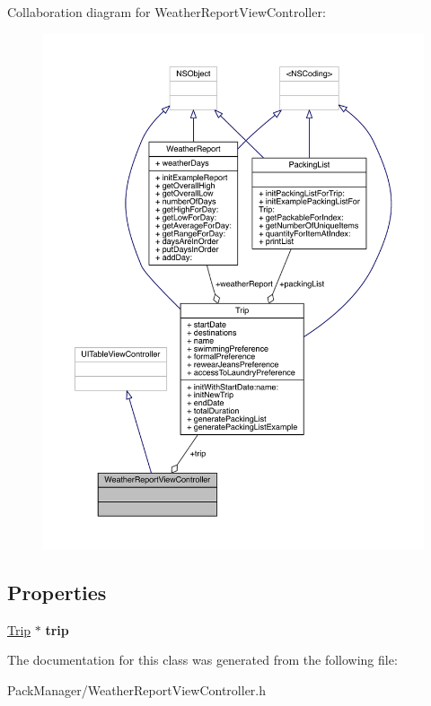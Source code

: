 Collaboration diagram for Weather\-Report\-View\-Controller\-:\nopagebreak
\begin{figure}[H]
\begin{center}
\leavevmode
\includegraphics[width=350pt]{interface_weather_report_view_controller__coll__graph}
\end{center}
\end{figure}
\subsection*{Properties}
\begin{DoxyCompactItemize}
\item 
\hypertarget{interface_weather_report_view_controller_a0cf14329780feb3d74d5bf0da154ff21}{\hyperlink{interface_trip}{Trip} $\ast$ {\bfseries trip}}\label{interface_weather_report_view_controller_a0cf14329780feb3d74d5bf0da154ff21}

\end{DoxyCompactItemize}


The documentation for this class was generated from the following file\-:\begin{DoxyCompactItemize}
\item 
Pack\-Manager/Weather\-Report\-View\-Controller.\-h\end{DoxyCompactItemize}
